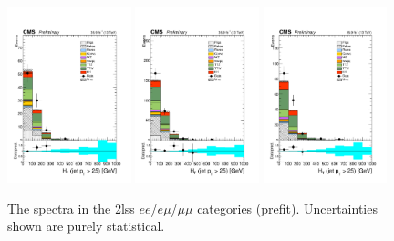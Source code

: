 \begin{figure}[htp]
\centering
\includegraphics[width=0.32\textwidth]{ch5_figs/ht_ttH_ee_stackPlot_SR.pdf}
\includegraphics[width=0.32\textwidth]{ch5_figs/ht_ttH_em_stackPlot_SR.pdf}
\includegraphics[width=0.32\textwidth]{ch5_figs/ht_ttH_mm_stackPlot_SR.pdf} \\
\caption[Data/MC comparison of the \ht spectra in the signal region]{The \ht spectra in the 2lss $ee$/$e\mu$/$\mu\mu$ categories (prefit). Uncertainties shown are purely statistical.}
\label{fig:sr_ht}
\end{figure}

